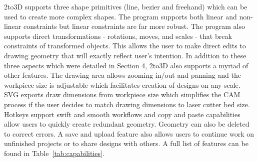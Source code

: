 2to3D supports three shape primitives (line, bezier and freehand) which can be used to create more complex shapes. The program supports both linear and non-linear constraints but linear constraints are far more robust. The program also supports direct transformations - rotations, moves, and scales - that break constraints of transformed objects. This allows the user to make direct edits to drawing geometry that will exactly reflect user's intention. In addition to these three aspects which were detailed in Section 4, 2to3D also supports a myriad of other features. The drawing area allows zooming in/out and panning and the workpiece size is adjustable which facilitates creation of designs on any scale. SVG exports draw dimensions from workpiece size which simplifies the CAM process if the user decides to match drawing dimensions to laser cutter bed size. Hotkeys support swift and smooth workflows and copy and paste capabilities allow users to quickly create redundant geometry. Geometry can also be deleted to correct errors. A save and upload feature also allows users to continue work on unfinished projects or to share designs with others. A full list of features can be found in Table~\ref{tab:capabilities}.

